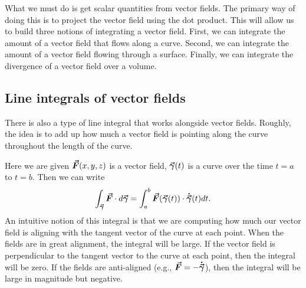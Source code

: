        What we must do is get scalar quantities from vector fields.  The primary way of doing this is to project the vector field using the dot product.  This will allow us to build three notions of integrating a vector field.  First, we can integrate the amount of a vector field that flows along a curve. Second, we can integrate the amount of a vector field flowing through a surface. Finally, we can integrate the divergence of a vector field over a volume.

        \subsection{Line integrals of vector fields}

        There is also a type of line integral that works alongside vector fields.  Roughly, the idea is to add up how much a vector field is pointing along the curve throughout the length of the curve.

        Here we are given $\boldsymbol{\vec{F}}(x,y,z)$ is a vector field, $\boldsymbol{\vec{\gamma}}(t)$ is a curve over the time $t=a$ to $t=b$.  Then we can write
        \[
        \int_{\boldsymbol{\vec{\gamma}}} \boldsymbol{\vec{F}} \cdot d\boldsymbol{\vec{\gamma}} =\int_a^b \boldsymbol{\vec{F}}(\boldsymbol{\vec{\gamma}}(t))\cdot \boldsymbol{\dot{\vec{\gamma}}}(t) dt.
        \]
        An intuitive notion of this integral is that we are computing how much our vector field is aligning with the tangent vector of the curve at each point.  When the fields are in great alignment, the integral will be large.  If the vector field is perpendicular to the tangent vector to the curve at each point, then the integral will be zero.  If the fields are anti-aligned (e.g., $\boldsymbol{\vec{F}} = -\boldsymbol{\dot{\vec{\gamma}}}$), then the integral will be large in magnitude but negative.

